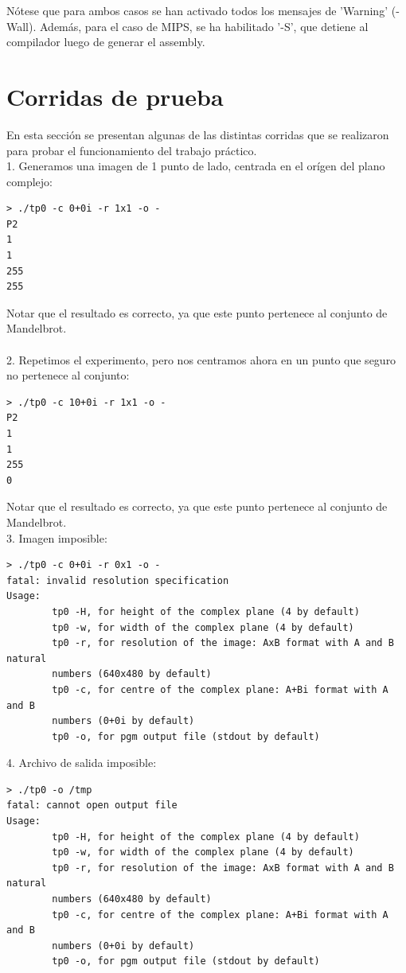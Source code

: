 \documentclass[a4paper,10pt]{article}
\begin{document}
N\'otese que para ambos casos se han activado todos los mensajes de 'Warning' (-Wall). Adem\'as, para el caso de MIPS, se ha habilitado '-S', que detiene al compilador luego de generar el assembly.
\pagebreak




\section{Corridas de prueba}

En esta secci\'on se presentan algunas de las distintas corridas que se
realizaron para probar el funcionamiento del trabajo pr\'actico.\\

1. Generamos una imagen de 1 punto de lado, centrada en el or\'igen del plano complejo:
\begin{verbatim}
> ./tp0 -c 0+0i -r 1x1 -o -
P2
1
1
255
255
\end{verbatim}

Notar que el resultado es correcto, ya que este punto pertenece al conjunto de Mandelbrot.\\
\\
2. Repetimos el experimento, pero nos centramos ahora en un punto que seguro no pertenece
al conjunto:
\begin{verbatim}
> ./tp0 -c 10+0i -r 1x1 -o -
P2
1
1
255
0
\end{verbatim}

Notar que el resultado es correcto, ya que este punto pertenece al conjunto de Mandelbrot.
\\
3. Imagen imposible:
\begin{verbatim}
> ./tp0 -c 0+0i -r 0x1 -o -
fatal: invalid resolution specification
Usage:
		tp0 -H, for height of the complex plane (4 by default)
		tp0 -w, for width of the complex plane (4 by default)
		tp0 -r, for resolution of the image: AxB format with A and B natural
		numbers (640x480 by default)
		tp0 -c, for centre of the complex plane: A+Bi format with A and B
		numbers (0+0i by default)
		tp0 -o, for pgm output file (stdout by default)
\end{verbatim}


4. Archivo de salida imposible:
\begin{verbatim}
> ./tp0 -o /tmp
fatal: cannot open output file
Usage:
		tp0 -H, for height of the complex plane (4 by default)
		tp0 -w, for width of the complex plane (4 by default)
		tp0 -r, for resolution of the image: AxB format with A and B natural
		numbers (640x480 by default)
		tp0 -c, for centre of the complex plane: A+Bi format with A and B
		numbers (0+0i by default)
		tp0 -o, for pgm output file (stdout by default)
\end{verbatim}
\end{document}
